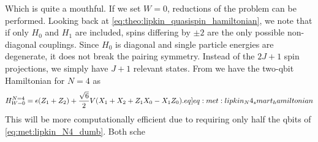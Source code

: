 Which is quite a mouthful. If we set $W = 0$, reductions of the problem can be performed. Looking back at \cref{eq:theo:lipkin_quasispin_hamiltonian}, we note that if only $H_0$ and $H_1$ are included,  spins differing by $\pm2$ are the only possible non-diagonal couplings. Since $H_0$ is diagonal and single particle energies are degenerate, it does not break the pairing symmetry. Instead of the $2J+1$ spin projections, we simply have $J+1$ relevant states. From \citep{hlatshwayoSimulatingExcitedStates2022} we have the two-qbit Hamiltonian for $N=4$ as
\begin{align}
    H_{W=0}^{N=4} = \epsilon(Z_1 + Z_2) + \frac{\sqrt{6}}{2}V (X_1 + X_2 + Z_1 X_0 - X_1 Z_0). \label[eq]{eq:met:lipkin_N4_smart_hamiltonian}
\end{align}
This will be more computationally efficient due to requiring only half the qbits of \cref{eq:met:lipkin_N4_dumb}. Both sche

